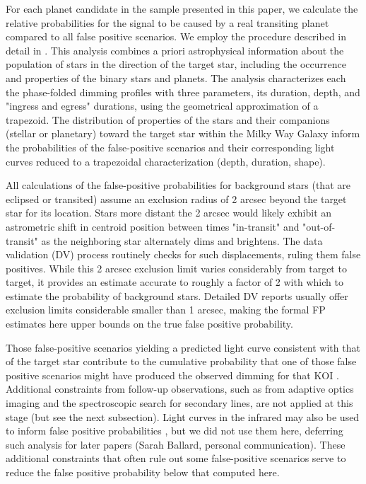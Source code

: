 \documentclass{emulateapj}
\begin{document}
For each planet candidate in the sample presented in this paper, we
 calculate the relative probabilities for the signal to be caused by a
 real transiting planet compared to all false positive scenarios.  We
 employ the procedure described in detail in \cite{Morton2012}.  This
 analysis combines a priori astrophysical information about the
 population of stars in the direction of the target star, including
 the occurrence and properties of the binary stars and planets.  The
 analysis characterizes each the phase-folded dimming profiles with
 three parameters, its duration, depth, and "ingress and egress"
 durations, using the geometrical approximation of a trapezoid.  The
 distribution of properties of the stars and their companions (stellar
 or planetary) toward the target star within the Milky Way Galaxy
 inform the probabilities of the false-positive scenarios and their
 corresponding light curves reduced to a trapezoidal characterization
 (depth, duration, shape).  
 
 All calculations of the false-positive probabilities for background stars (that are eclipsed or transited) assume an exclusion radius of 2 arcsec beyond the target star for its location.  Stars more distant the 2 arcsec would likely exhibit an astrometric shift in centroid position between times "in-transit" and "out-of-transit" as the neighboring star alternately dims and brightens.  The \ek data validation (DV) process routinely checks for such displacements, ruling them false positives.  While this 2 arcsec exclusion limit varies considerably from target to target, it provides an estimate accurate to roughly a factor of 2 with which to estimate the probability of background stars.   Detailed DV reports usually offer exclusion limits considerable smaller than 1 arcsec, making the formal FP estimates here upper bounds on the true false positive probability.

Those false-positive scenarios yielding a
 predicted light curve consistent with that of the \ek target star
 contribute to the cumulative probability that one of those false
 positive scenarios might have produced the observed dimming for that
 KOI \cite{Morton2012}.  Additional constraints from follow-up
 observations, such as from adaptive optics imaging and the
 spectroscopic search for secondary lines, are not applied at this
 stage (but see the next subsection).  Light curves in the infrared
 may also be used to inform false positive probabilities
 \citep{Desert2012, Cochran2011, Ballard2013}, but we did not use them
 here, deferring such analysis for later papers (Sarah Ballard,
 personal communication). These additional constraints that often rule
 out some false-positive scenarios serve to reduce the false positive
 probability below that computed here.
\end{document}

